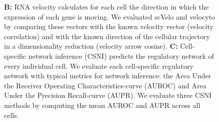 \documentclass[
  table,
  10pt,
  a4paper]{article}
\begin{document}
\begin{figure}[t!]
{      \textbf{B:} RNA velocity calculates for each cell the direction in which the expression of each gene is moving. We evaluated scVelo and velocyto by comparing these vectors with the known velocity vector (velocity correlation) and with the known direction of the cellular trajectory in a dimensionality reduction (velocity arrow cosine).
      \textbf{C:} Cell-specific network inference (CSNI) predicts the regulatory network of every individual cell. We evaluate each cell-specific regulatory network with typical metrics for network inference: the Area Under the Receiver Operating Characteristics-curve (AUROC) and Area Under the Precision Recall-curve (AUPR). We evaluate three CSNI methods by computing the mean AUROC and AUPR across all cells.
    }
    \label{fig:applications}
\end{figure}
\end{document}
